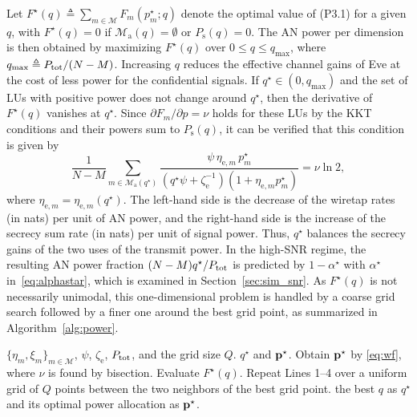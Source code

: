 \documentclass[journal]{IEEEtran}
\newcommand{\rev}[1]{{\color{red}#1}}
\newcommand{\rev}[1]{#1}
\begin{document}
Let $F^\star(q)\triangleq\sum_{m\in\mathcal M}F_m(p_m^\star;q)$ denote the optimal value of (P3.1) for a given $q$, with $F^\star(q)=0$ if $\mathcal M_{\mathrm a}(q)=\emptyset$ or $P_{\mathrm s}(q)=0$. The AN power per dimension is then obtained by maximizing $F^\star(q)$ over $0\le q\le q_{\max}$, where $q_{\max}\triangleq P_{\mathrm{tot}}/(N-M)$. Increasing $q$ reduces the effective channel gains of Eve at the cost of less power for the confidential signals. \rev{If $q^\star\in(0,q_{\max})$ and the set of LUs with positive power does not change around $q^\star$, then the derivative of $F^\star(q)$ vanishes at $q^\star$. Since $\partial F_m/\partial p=\nu$ holds for these LUs by the KKT conditions and their powers sum to $P_{\mathrm s}(q)$, it can be verified that this condition is given by
\begin{equation}\label{eq:qstat}
\frac{1}{N-M}\sum_{m\in\mathcal M_{\mathrm a}(q^\star)}\frac{\psi\,\eta_{\mathrm{e},m}\,p_m^\star}{(q^\star\psi+\zeta_{\mathrm e}^{-1})(1+\eta_{\mathrm{e},m}p_m^\star)}=\nu\ln2,
\end{equation}
where $\eta_{\mathrm{e},m}=\eta_{\mathrm{e},m}(q^\star)$. The left-hand side is the decrease of the wiretap rates (in nats) per unit of AN power, and the right-hand side is the increase of the secrecy sum rate (in nats) per unit of signal power. Thus, $q^\star$ balances the secrecy gains of the two uses of the transmit power. In the high-SNR regime, the resulting AN power fraction $(N-M)q^\star/P_{\mathrm{tot}}$ is predicted by $1-\alpha^\star$ with $\alpha^\star$ in~\eqref{eq:alphastar}, which is examined in Section~\ref{sec:sim_snr}.} As $F^\star(q)$ is not necessarily unimodal, this one-dimensional problem is handled by a coarse grid search followed by a finer one around the best grid point, as summarized in Algorithm~\ref{alg:power}.

\begin{algorithm}[t]
\caption{Power Allocation for Given $\bt$}\label{alg:power}
\small\begin{algorithmic}[1]
\Require $\{\eta_m,\xi_m\}_{m\in\mathcal M}$, $\psi$, $\zeta_{\mathrm e}$, $P_{\mathrm{tot}}$, and the grid size $Q$.
\Ensure $q^\star$ and $\mathbf{p}^\star$.
  \State Obtain $\mathbf{p}^\star$ by \eqref{eq:wf}, where $\nu$ is found by bisection.
  \State Evaluate $F^\star(q)$.
\EndFor
\State Repeat Lines 1--4 over a uniform grid of $Q$ points between the two neighbors of the best grid point.
\State \Return the best $q$ as $q^\star$ and its optimal power allocation as $\mathbf{p}^\star$.
\end{algorithmic}
\end{algorithm}
\end{document}
